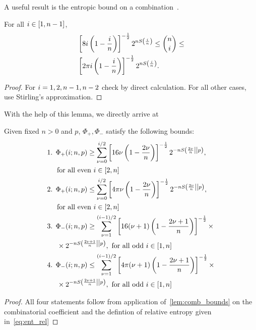 A useful result is the entropic bound on a combination~\cite{cit:ash}.
\begin{lemma}\label{lem:comb_bounds}
	For all $i\in [1,n-1]$,
	\begin{align}
		&\left[ 8i\left(1-\frac{i}{n}\right) \right]^{-\frac{1}{2}} 2^{n S\left(\frac{i}{n}\right)} \leq \binom{n}{i} \leq \\
		&\left[ 2\pi i\left(1-\frac{i}{n}\right) \right]^{-\frac{1}{2}} 2^{n S\left(\frac{i}{n}\right)}.
	\end{align}
\end{lemma}
\begin{proof}
	For $i = 1,2, n-1, n-2$ check by direct calculation.	
	For all other cases, use Stirling's approximation. 
\end{proof}
With the help of this lemma, we directly arrive at 
\begin{theorem}\label{thm:bounds_strict}
	Given fixed $n>0$ and $p$, $\Phi_+, \Phi_-$ satisfy the following bounds:
	\begin{align*}
		\begin{split}
		&\text{1. } \Phi_+(i; n, p) \geq \sum\limits_{\nu=0}^{i/2}\left[ 16\nu\left(1-\frac{2\nu}{n}\right) \right]^{-\frac{1}{2}} 2^{-nS\left( \frac{2\nu}{n} \middle\vert\middle\vert p \right)}, \\
		&\hspace{14pt} \text{for all even } i\in [2,n] \\
		&\text{2. } \Phi_+(i; n, p) \leq \sum\limits_{\nu=0}^{i/2}\left[ 4\pi\nu\left(1-\frac{2\nu}{n}\right) \right]^{-\frac{1}{2}} 2^{-nS\left( \frac{2\nu}{n} \middle\vert\middle\vert p \right)}, \\
		&\hspace{14pt} \text{for all even } i\in [2,n] \\
		&\text{3. } \Phi_-(i; n, p) \geq \sum\limits_{\nu=1}^{(i-1)/2}\left[ 16(\nu+1)\left(1-\frac{2\nu+1}{n}\right) \right]^{-\frac{1}{2}} \times \\
		&\hspace{14pt} \times 2^{-nS\left( \frac{2\nu+1}{n} \middle\vert\middle\vert p \right)},\ \text{for all odd }i\in [1,n] \\
		&\text{4. } \Phi_-(i; n, p) \leq \sum\limits_{\nu=1}^{(i-1)/2}\left[ 4\pi(\nu+1)\left(1-\frac{2\nu+1}{n}\right) \right]^{-\frac{1}{2}} \times \\
		&\hspace{14pt} \times 2^{-nS\left( \frac{2\nu+1}{n} \middle\vert\middle\vert p \right)},\ \text{for all odd } i\in [1,n]
		\end{split}
	\end{align*}
\end{theorem}
\begin{proof}
	All four statements follow from application of~\cref{lem:comb_bounds} on the combinatorial coefficient and the defintion of relative entropy given in~\cref{eq:ent_rel}
\end{proof}

